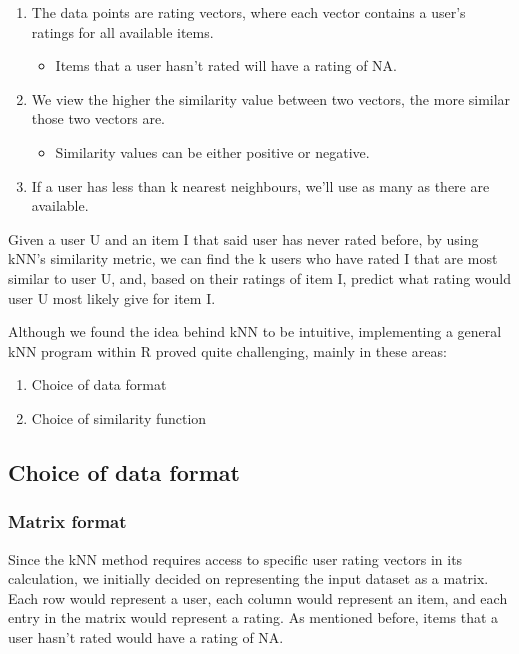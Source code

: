 \documentclass{article}
\begin{document}
\begin{enumerate}
    \item The data points are rating vectors, where each vector contains a user's ratings for all available items.
    \begin{itemize}
        \item Items that a user hasn't rated will have a rating of NA.
    \end{itemize}
    \item We view the higher the similarity value between two vectors, the more similar those two vectors are.
    \begin{itemize}
        \item Similarity values can be either positive or negative.
    \end{itemize}
    \item If a user has less than k nearest neighbours, we'll use as many as there are available.
\end{enumerate}

Given a user U and an item I that said user has never rated before, by using kNN's similarity metric, we can find the k users who have rated I that are most similar to user U, and, based on their ratings of item I, predict what rating would user U most likely give for item I.

Although we found the idea behind kNN to be intuitive, implementing a general kNN program within R proved quite challenging, mainly in these areas:
\begin{enumerate}
    \item Choice of data format
    \item Choice of similarity function
\end{enumerate}

\subsection{Choice of data format}

\subsubsection{Matrix format}

Since the kNN method requires access to specific user rating vectors in its calculation, we initially decided on representing the input dataset as a matrix. Each row would represent a user, each column would represent an item, and each entry in the matrix would represent a rating. As mentioned before, items that a user hasn't rated would have a rating of NA. 
\end{document}
